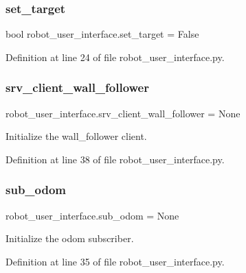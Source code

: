 \subsubsection{\texorpdfstring{set\+\_\+target}{set\_target}}
{\footnotesize\ttfamily bool robot\+\_\+user\+\_\+interface.\+set\+\_\+target = False}



Definition at line 24 of file robot\+\_\+user\+\_\+interface.\+py.

\mbox{\label{namespacerobot__user__interface_a95d6798bc3ba3f2e590443ca7ad8d7d4}} 
\subsubsection{\texorpdfstring{srv\+\_\+client\+\_\+wall\+\_\+follower}{srv\_client\_wall\_follower}}
{\footnotesize\ttfamily robot\+\_\+user\+\_\+interface.\+srv\+\_\+client\+\_\+wall\+\_\+follower = None}



Initialize the wall\+\_\+follower client. 



Definition at line 38 of file robot\+\_\+user\+\_\+interface.\+py.

\mbox{\label{namespacerobot__user__interface_a18cc77d7f27b808397c9d58367a25280}} 
\subsubsection{\texorpdfstring{sub\+\_\+odom}{sub\_odom}}
{\footnotesize\ttfamily robot\+\_\+user\+\_\+interface.\+sub\+\_\+odom = None}



Initialize the odom subscriber. 



Definition at line 35 of file robot\+\_\+user\+\_\+interface.\+py.

